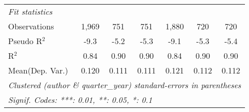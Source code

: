 \begin{tabular}{lcccccc}
   \midrule
   \emph{Fit statistics}\\
   Observations            & 1,969   & 751     & 751           & 1,880   & 720     & 720\\  
   Pseudo R$^2$            & -9.3    & -5.2    & -5.3          & -9.1    & -5.3    & -5.4\\  
   R$^2$                   & 0.84    & 0.90    & 0.90          & 0.84    & 0.90    & 0.90\\  
Mean(Dep. Var.) & 0.120 & 0.111 & 0.111 & 0.121 & 0.112 & 0.112 \\
   \midrule \midrule
   \multicolumn{7}{l}{\emph{Clustered (author \& quarter\_year) standard-errors in parentheses}}\\
   \multicolumn{7}{l}{\emph{Signif. Codes: ***: 0.01, **: 0.05, *: 0.1}}\\
\end{tabular}
\par\endgroup
